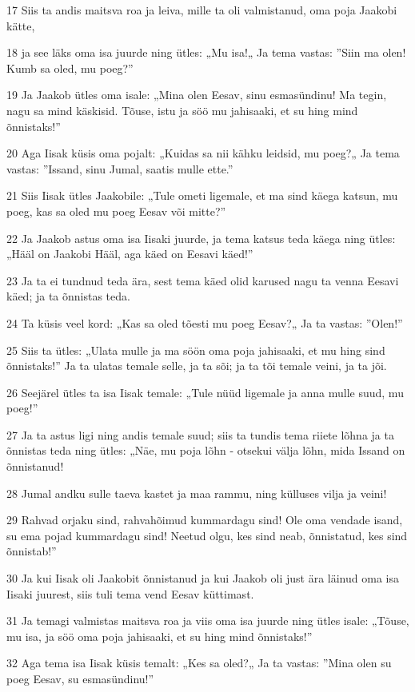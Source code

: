\par 17 Siis ta andis maitsva roa ja leiva, mille ta oli valmistanud, oma poja Jaakobi kätte,
\par 18 ja see läks oma isa juurde ning ütles: „Mu isa!„ Ja tema vastas: ”Siin ma olen! Kumb sa oled, mu poeg?”
\par 19 Ja Jaakob ütles oma isale: „Mina olen Eesav, sinu esmasündinu! Ma tegin, nagu sa mind käskisid. Tõuse, istu ja söö mu jahisaaki, et su hing mind õnnistaks!”
\par 20 Aga Iisak küsis oma pojalt: „Kuidas sa nii kähku leidsid, mu poeg?„ Ja tema vastas: ”Issand, sinu Jumal, saatis mulle ette.”
\par 21 Siis Iisak ütles Jaakobile: „Tule ometi ligemale, et ma sind käega katsun, mu poeg, kas sa oled mu poeg Eesav või mitte?”
\par 22 Ja Jaakob astus oma isa Iisaki juurde, ja tema katsus teda käega ning ütles: „Hääl on Jaakobi Hääl, aga käed on Eesavi käed!”
\par 23 Ja ta ei tundnud teda ära, sest tema käed olid karused nagu ta venna Eesavi käed; ja ta õnnistas teda.
\par 24 Ta küsis veel kord: „Kas sa oled tõesti mu poeg Eesav?„ Ja ta vastas: ”Olen!”
\par 25 Siis ta ütles: „Ulata mulle ja ma söön oma poja jahisaaki, et mu hing sind õnnistaks!” Ja ta ulatas temale selle, ja ta sõi; ja ta tõi temale veini, ja ta jõi.
\par 26 Seejärel ütles ta isa Iisak temale: „Tule nüüd ligemale ja anna mulle suud, mu poeg!”
\par 27 Ja ta astus ligi ning andis temale suud; siis ta tundis tema riiete lõhna ja ta õnnistas teda ning ütles: „Näe, mu poja lõhn - otsekui välja lõhn, mida Issand on õnnistanud!
\par 28 Jumal andku sulle taeva kastet ja maa rammu, ning külluses vilja ja veini!
\par 29 Rahvad orjaku sind, rahvahõimud kummardagu sind! Ole oma vendade isand, su ema pojad kummardagu sind! Neetud olgu, kes sind neab, õnnistatud, kes sind õnnistab!”
\par 30 Ja kui Iisak oli Jaakobit õnnistanud ja kui Jaakob oli just ära läinud oma isa Iisaki juurest, siis tuli tema vend Eesav küttimast.
\par 31 Ja temagi valmistas maitsva roa ja viis oma isa juurde ning ütles isale: „Tõuse, mu isa, ja söö oma poja jahisaaki, et su hing mind õnnistaks!”
\par 32 Aga tema isa Iisak küsis temalt: „Kes sa oled?„ Ja ta vastas: ”Mina olen su poeg Eesav, su esmasündinu!”
